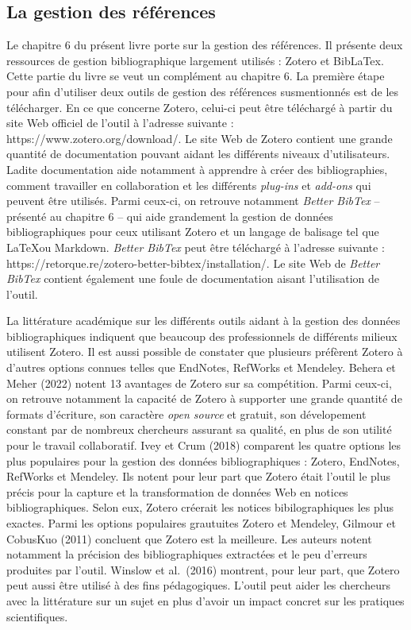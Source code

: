 \documentclass[
  letterpaper,
  DIV=11,
  numbers=noendperiod]{scrreprt}
\begin{document}
\subsection{La gestion des
références}\label{la-gestion-des-ruxe9fuxe9rences-1}

Le chapitre 6 du présent livre porte sur la gestion des références. Il
présente deux ressources de gestion bibliographique largement utilisés :
Zotero et BibLaTex. Cette partie du livre se veut un complément au
chapitre 6. La première étape pour afin d'utiliser deux outils de
gestion des références susmentionnés est de les télécharger. En ce que
concerne Zotero, celui-ci peut être téléchargé à partir du site Web
officiel de l'outil à l'adresse suivante :
https://www.zotero.org/download/. Le site Web de Zotero contient une
grande quantité de documentation pouvant aidant les différents niveaux
d'utilisateurs. Ladite documentation aide notamment à apprendre à créer
des bibliographies, comment travailler en collaboration et les
différents \emph{plug-ins} et \emph{add-ons} qui peuvent être utilisés.
Parmi ceux-ci, on retrouve notamment \emph{Better BibTex} -- présenté au
chapitre 6 -- qui aide grandement la gestion de données bibliographiques
pour ceux utilisant Zotero et un langage de balisage tel que \LaTeX ou
Markdown. \emph{Better BibTex} peut être téléchargé à l'adresse suivante
: https://retorque.re/zotero-better-bibtex/installation/. Le site Web de
\emph{Better BibTex} contient également une foule de documentation
aisant l'utilisation de l'outil.

La littérature académique sur les différents outils aidant à la gestion
des données bibliographiques indiquent que beaucoup des professionnels
de différents milieux utilisent Zotero. Il est aussi possible de
constater que plusieurs préfèrent Zotero à d'autres options connues
telles que EndNotes, RefWorks et Mendeley. Behera et Meher (2022) notent
13 avantages de Zotero sur sa compétition. Parmi ceux-ci, on retrouve
notamment la capacité de Zotero à supporter une grande quantité de
formats d'écriture, son caractère \emph{open source} et gratuit, son
dévelopement constant par de nombreux chercheurs assurant sa qualité, en
plus de son utilité pour le travail collaboratif. Ivey et Crum (2018)
comparent les quatre options les plus populaires pour la gestion des
données bibliographiques : Zotero, EndNotes, RefWorks et Mendeley. Ils
notent pour leur part que Zotero était l'outil le plus précis pour la
capture et la transformation de données Web en notices bibliographiques.
Selon eux, Zotero créerait les notices bibilographiques les plus
exactes. Parmi les options populaires grautuites Zotero et Mendeley,
Gilmour et CobusKuo (2011) concluent que Zotero est la meilleure. Les
auteurs notent notamment la précision des bibliographiques extractées et
le peu d'erreurs produites par l'outil. Winslow et al.~(2016) montrent,
pour leur part, que Zotero peut aussi être utilisé à des fins
pédagogiques. L'outil peut aider les chercheurs avec la littérature sur
un sujet en plus d'avoir un impact concret sur les pratiques
scientifiques.
\end{document}
